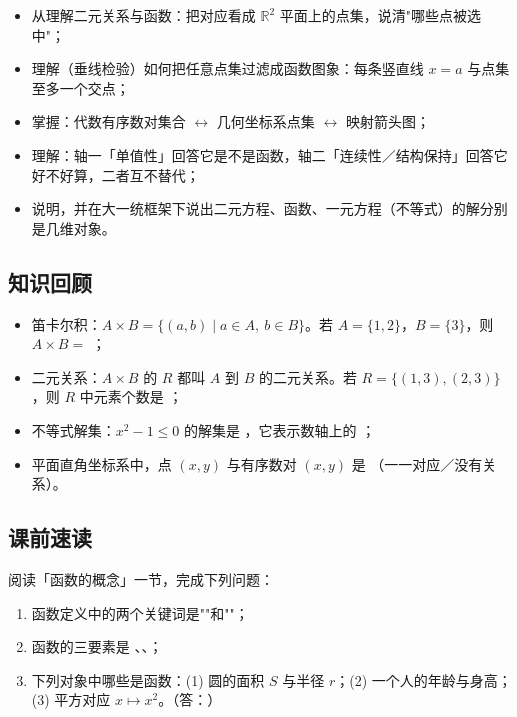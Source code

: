\begin{learnobjective}
\begin{itemize}
  \item 从理解二元关系与函数：把对应看成 $\mathbb{R}^2$ 平面上的点集，说清"哪些点被选中"；
  \item 理解（垂线检验）如何把任意点集过滤成函数图象：每条竖直线 $x=a$ 与点集至多一个交点；
  \item 掌握：代数有序数对集合 $\leftrightarrow$ 几何坐标系点集 $\leftrightarrow$ 映射箭头图；
  \item 理解：轴一「单值性」回答它是不是函数，轴二「连续性／结构保持」回答它好不好算，二者互不替代；
  \item 说明，并在大一统框架下说出二元方程、函数、一元方程（不等式）的解分别是几维对象。
\end{itemize}
\end{learnobjective}

\begin{preview}
\subsection*{知识回顾}
\begin{itemize}
  \item 笛卡尔积：$A\times B=\{(a,b)\mid a\in A,\ b\in B\}$。若 $A=\{1,2\}$，$B=\{3\}$，则 $A\times B=$ \blank；
  \item 二元关系：$A\times B$ 的 $R$ 都叫 $A$ 到 $B$ 的二元关系。若 $R=\{(1,3),(2,3)\}$，则 $R$ 中元素个数是 \blank；
  \item 不等式解集：$x^2-1\leq0$ 的解集是 \blank，它表示数轴上的 \blank；
  \item 平面直角坐标系中，点 $(x,y)$ 与有序数对 $(x,y)$ 是 \blank（一一对应／没有关系）。
\end{itemize}

\subsection*{课前速读}
阅读「函数的概念」一节，完成下列问题：
\begin{enumerate}
  \item 函数定义中的两个关键词是""和""；
  \item 函数的三要素是 \blank、\blank、\blank；
  \item 下列对象中哪些是函数：(1) 圆的面积 $S$ 与半径 $r$；(2) 一个人的年龄与身高；(3) 平方对应 $x\mapsto x^2$。（答：\blank）
\end{enumerate}
\end{preview}

